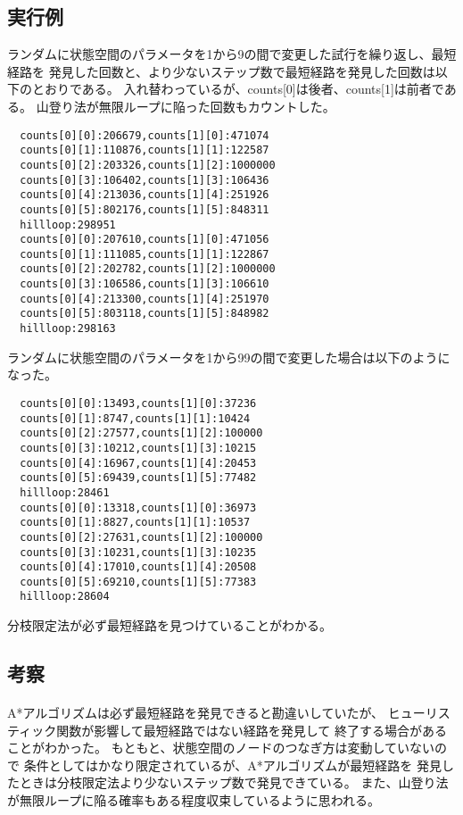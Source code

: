 \documentclass{jarticle}
\begin{document}
\subsection{実行例}
ランダムに状態空間のパラメータを1から9の間で変更した試行を繰り返し、最短経路を
発見した回数と、より少ないステップ数で最短経路を発見した回数は以下のとおりである。
入れ替わっているが、counts[0]は後者、counts[1]は前者である。
山登り法が無限ループに陥った回数もカウントした。

\begin{lstlisting}
  counts[0][0]:206679,counts[1][0]:471074
  counts[0][1]:110876,counts[1][1]:122587
  counts[0][2]:203326,counts[1][2]:1000000
  counts[0][3]:106402,counts[1][3]:106436
  counts[0][4]:213036,counts[1][4]:251926
  counts[0][5]:802176,counts[1][5]:848311
  hillloop:298951
  counts[0][0]:207610,counts[1][0]:471056
  counts[0][1]:111085,counts[1][1]:122867
  counts[0][2]:202782,counts[1][2]:1000000
  counts[0][3]:106586,counts[1][3]:106610
  counts[0][4]:213300,counts[1][4]:251970
  counts[0][5]:803118,counts[1][5]:848982
  hillloop:298163
\end{lstlisting}

ランダムに状態空間のパラメータを1から99の間で変更した場合は以下のようになった。

\begin{lstlisting}
  counts[0][0]:13493,counts[1][0]:37236
  counts[0][1]:8747,counts[1][1]:10424
  counts[0][2]:27577,counts[1][2]:100000
  counts[0][3]:10212,counts[1][3]:10215
  counts[0][4]:16967,counts[1][4]:20453
  counts[0][5]:69439,counts[1][5]:77482
  hillloop:28461
  counts[0][0]:13318,counts[1][0]:36973
  counts[0][1]:8827,counts[1][1]:10537
  counts[0][2]:27631,counts[1][2]:100000
  counts[0][3]:10231,counts[1][3]:10235
  counts[0][4]:17010,counts[1][4]:20508
  counts[0][5]:69210,counts[1][5]:77383
  hillloop:28604
\end{lstlisting}

分枝限定法が必ず最短経路を見つけていることがわかる。

\subsection{考察}
\paragraph{}
A*アルゴリズムは必ず最短経路を発見できると勘違いしていたが、
ヒューリスティック関数が影響して最短経路ではない経路を発見して
終了する場合があることがわかった。
もともと、状態空間のノードのつなぎ方は変動していないので
条件としてはかなり限定されているが、A*アルゴリズムが最短経路を
発見したときは分枝限定法より少ないステップ数で発見できている。
また、山登り法が無限ループに陥る確率もある程度収束しているように思われる。
\end{document}
